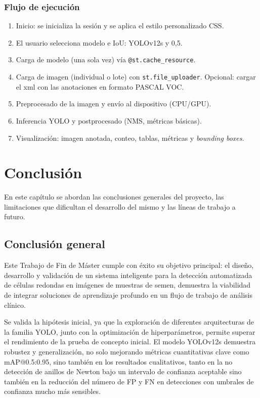 \documentclass[12pt,a4paper,onecolumn,oneside]{report}
\begin{document}
\subsection{Flujo de ejecución}
\begin{enumerate}
  \item Inicio: se inicializa la sesión y se aplica el estilo personalizado CSS.
  \item El usuario selecciona modelo e IoU: YOLOv12s y 0,5.
  \item Carga de modelo (una sola vez) vía \texttt{@st.cache\_resource}.
  \item Carga de imagen (individual o lote) con \texttt{st.file\_uploader}. Opcional: cargar el xml con las anotaciones en formato PASCAL VOC.
  \item Preprocesado de la imagen y envío al dispositivo (CPU/GPU).
  \item Inferencia YOLO y postprocesado (NMS, métricas básicas).
  \item Visualización: imagen anotada, conteo, tablas, métricas y \textit{bounding boxes}.
\end{enumerate}


\chapter{Conclusión} %

En este capítulo se abordan las conclusiones generales del proyecto, las limitaciones que dificultan el desarrollo del mismo y las líneas de trabajo a futuro.

\section{Conclusión general}
\label{sec:Conclusión general}

Este Trabajo de Fin de Máster cumple con éxito su objetivo principal: el diseño, desarrollo y validación de un sistema inteligente para la detección automatizada de células redondas en imágenes de muestras de semen, demuestra
la viabilidad de integrar soluciones de aprendizaje profundo en un flujo de trabajo de análisis clínico.

Se valida la hipótesis inicial, ya que la exploración de diferentes arquitecturas de la familia YOLO, junto con la optimización de hiperparámetros, permite superar el rendimiento de la prueba de concepto inicial. 
El modelo YOLOv12s demuestra robustez y generalización, no solo mejorando métricas cuantitativas clave como mAP@0.5:0.95, sino también en los resultados cualitativos, tanto en la no detección de anillos de Newton bajo un intervalo de confianza aceptable sino también
en la reducción del número de FP y FN en detecciones con umbrales de confianza mucho más sensibles.  
\end{document}

